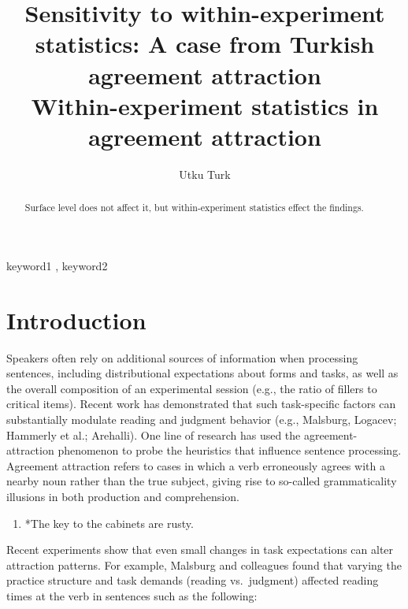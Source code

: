 \documentclass[
  authoryear,
  preprint]{elsarticle}
\providecommand{\tightlist}{%
  \setlength{\itemsep}{0pt}\setlength{\parskip}{0pt}}
\begin{document}
\begin{frontmatter}
\title{Sensitivity to within-experiment statistics: A case from Turkish
agreement attraction \\\large{Within-experiment statistics in agreement
attraction} }
\author[1]{Utku Turk%
%
}



        
\begin{abstract}
Surface level does not affect it, but within-experiment statistics
effect the findings.
\end{abstract}





\begin{keyword}
    keyword1 \sep 
    keyword2
\end{keyword}
\end{frontmatter}
    

\section{Introduction}\label{introduction}

Speakers often rely on additional sources of information when processing
sentences, including distributional expectations about forms and tasks,
as well as the overall composition of an experimental session (e.g., the
ratio of fillers to critical items). Recent work has demonstrated that
such task-specific factors can substantially modulate reading and
judgment behavior (e.g., Malsburg, Logacev; Hammerly et al.; Arehalli).
One line of research has used the agreement-attraction phenomenon to
probe the heuristics that influence sentence processing. Agreement
attraction refers to cases in which a verb erroneously agrees with a
nearby noun rather than the true subject, giving rise to so-called
grammaticality illusions in both production and comprehension.

\begin{enumerate}
\def\labelenumi{\arabic{enumi}.}
\tightlist
\item
  *The key to the cabinets are rusty.
\end{enumerate}

Recent experiments show that even small changes in task expectations can
alter attraction patterns. For example, Malsburg and colleagues found
that varying the practice structure and task demands (reading
vs.~judgment) affected reading times at the verb in sentences such as
the following:
\end{document}
